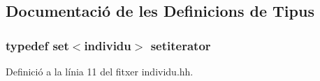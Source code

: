 \subsection{Documentació de les Definicions de Tipus}
\subsubsection[{\texorpdfstring{setiterator}{setiterator}}]{\setlength{\rightskip}{0pt plus 5cm}typedef set$<${\bf individu}$>$ {\bf setiterator}}\hypertarget{individu_8hh_a32dbccbf05588c8c12b0111d5c5c6eb3}{}\label{individu_8hh_a32dbccbf05588c8c12b0111d5c5c6eb3}


Definició a la línia 11 del fitxer individu.\+hh.

